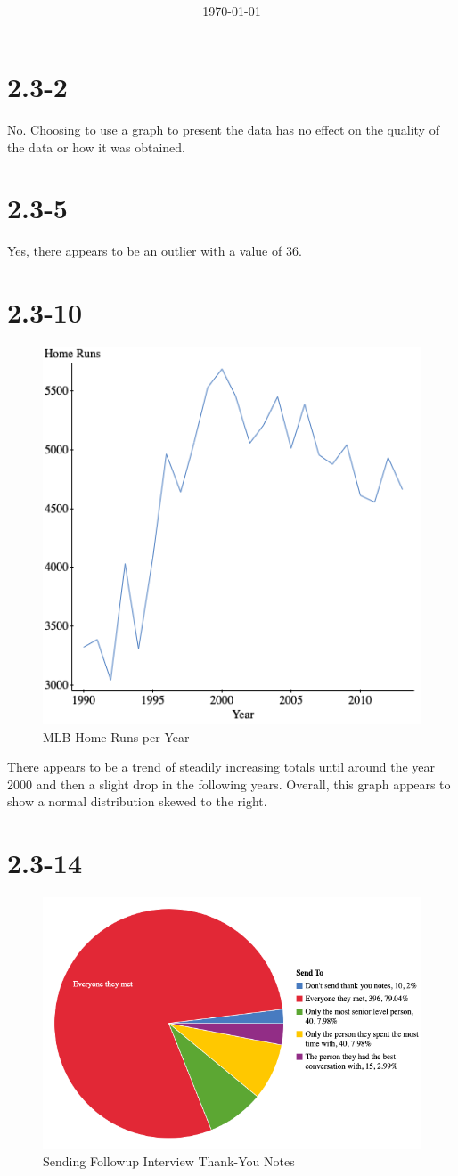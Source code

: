 \documentclass[12pt]{article}
\title{\classdescription\ \\ \classname\ \\ $\ $ \\ \assignment}
\author{\authorname}
\date{\today}
\newcommand{\chapter}{2.3}
\newcommand{\problem}[1]{\vspace{5ex}\section*{\chapter-#1}}
\begin{document}
\maketitle

\problem{2}
No. Choosing to use a graph to present the data has no effect on the quality of the data or how it was obtained.


\problem{5}
Yes, there appears to be an outlier with a value of 36.

\pagebreak
\problem{10}
\begin{figure}[ht]
  \centering
  \includegraphics[width=12cm]{assets/home-runs.png}
  \caption{MLB Home Runs per Year}
\end{figure}

There appears to be a trend of steadily increasing totals until around the year 2000 and then a slight drop in the following years. Overall, this graph appears to show a normal distribution skewed to the right.


\pagebreak
\problem{14}
\begin{figure}[ht]
  \centering
  \includegraphics[width=14cm]{assets/job-interview-notes.png}
  \caption{Sending Followup Interview Thank-You Notes}
\end{figure}
\end{document}
